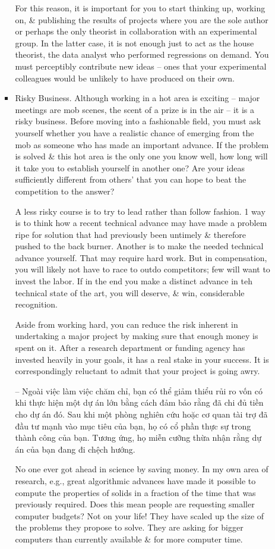 \documentclass{article}
\begin{document}
\begin{enumerate}
\begin{itemize}
\begin{itemize}
			For this reason, it is important for you to start thinking up, working on, \& publishing the results of projects where you are the sole author or perhaps the only theorist in collaboration with an experimental group. In the latter case, it is not enough just to act as the house theorist, the data analyst who performed regressions on demand. You must perceptibly contribute new ideas -- ones that your experimental colleagues would be unlikely to have produced on their own.
			\item {\sf Risky Business.} Although working in a hot area is exciting -- major meetings are mob scenes, the scent of a prize is in the air -- it is a risky business. Before moving into a fashionable field, you must ask yourself whether you have a realistic chance of emerging from the mob as someone who has made an important advance. If the problem is solved \& this hot area is the only one you know well, how long will it take you to establish yourself in another one? Are your ideas sufficiently different from others' that you can hope to beat the competition to the answer?
			
			A less risky course is to try to lead rather than follow fashion. 1 way is to think how a recent technical advance may have made a problem ripe for solution that had previously been untimely \& therefore pushed to the back burner. Another is to make the needed technical advance yourself. That may require hard work. But in compensation, you will likely not have to race to outdo competitors; few will want to invest the labor. If in the end you make a distinct advance in teh technical state of the art, you will deserve, \& win, considerable recognition.
			
			Aside from working hard, you can reduce the risk inherent in undertaking a major project by making sure that enough money is spent on it. After a research department or funding agency has invested heavily in your goals, it has a real stake in your success. It is correspondingly reluctant to admit that your project is going awry.
			
			-- Ngoài việc làm việc chăm chỉ, bạn có thể giảm thiểu rủi ro vốn có khi thực hiện một dự án lớn bằng cách đảm bảo rằng đã chi đủ tiền cho dự án đó. Sau khi một phòng nghiên cứu hoặc cơ quan tài trợ đã đầu tư mạnh vào mục tiêu của bạn, họ có cổ phần thực sự trong thành công của bạn. Tương ứng, họ miễn cưỡng thừa nhận rằng dự án của bạn đang đi chệch hướng.
			
			No one ever got ahead in science by saving money. In my own area of research, e.g., great algorithmic advances have made it possible to compute the properties of solids in a fraction of the time that was previously required. Does this mean people are requesting smaller computer budgets? Not on your life! They have scaled up the size of the problems they propose to solve. They are asking for bigger computers than currently available \& for more computer time.
			

\end{itemize}
\end{itemize}
\end{enumerate}
\end{document}
